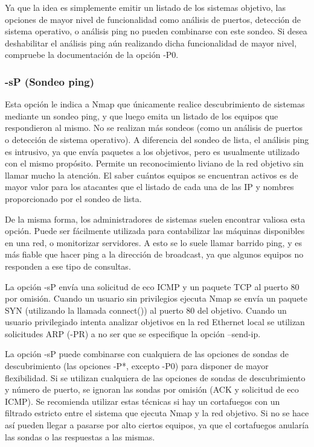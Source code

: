 \documentclass[a4paper, 11pt, titlepage]{book}
\begin{document}
            Ya que la idea es simplemente emitir un listado de los sistemas objetivo, las opciones de 
            mayor nivel de funcionalidad como análisis de puertos, detección de sistema operativo, o 
            análisis ping no pueden combinarse con este sondeo. Si desea deshabilitar el análisis ping 
            aún realizando dicha funcionalidad de mayor nivel, compruebe la documentación de la opción -P0.

            \subsubsection{-sP (Sondeo ping)} Esta opción le indica a Nmap que únicamente realice 
            descubrimiento de sistemas mediante un sondeo ping, y que luego emita un listado de los equipos 
            que respondieron al mismo. No se realizan más sondeos (como un análisis de puertos o detección 
            de sistema operativo). A diferencia del sondeo de lista, el análisis ping es intrusivo, ya que 
            envía paquetes a los objetivos, pero es usualmente utilizado con el mismo propósito. Permite 
            un reconocimiento liviano de la red objetivo sin llamar mucho la atención. El saber cuántos 
            equipos se encuentran activos es de mayor valor para los atacantes que el listado de cada una 
            de las IP y nombres proporcionado por el sondeo de lista.

            De la misma forma, los administradores de sistemas suelen encontrar valiosa esta opción. 
            Puede ser fácilmente utilizada para contabilizar las máquinas disponibles en una red, o 
            monitorizar servidores. A esto se lo suele llamar barrido ping, y es más fiable que hacer 
            ping a la dirección de broadcast, ya que algunos equipos no responden a ese tipo de consultas.

            La opción -sP envía una solicitud de eco ICMP y un paquete TCP al puerto 80 por omisión. 
            Cuando un usuario sin privilegios ejecuta Nmap se envía un paquete SYN (utilizando la llamada 
            connect()) al puerto 80 del objetivo. Cuando un usuario privilegiado intenta analizar objetivos 
            en la red Ethernet local se utilizan solicitudes ARP (-PR) a no ser que se especifique la 
            opción --send-ip.

            La opción -sP puede combinarse con cualquiera de las opciones de sondas de descubrimiento 
            (las opciones -P*, excepto -P0) para disponer de mayor flexibilidad. Si se utilizan cualquiera 
            de las opciones de sondas de descubrimiento y número de puerto, se ignoran las sondas por omisión 
            (ACK y solicitud de eco ICMP). Se recomienda utilizar estas técnicas si hay un cortafuegos con un 
            filtrado estricto entre el sistema que ejecuta Nmap y la red objetivo. Si no se hace así pueden 
            llegar a pasarse por alto ciertos equipos, ya que el cortafuegos anularía las sondas o las 
            respuestas a las mismas.
\end{document}
